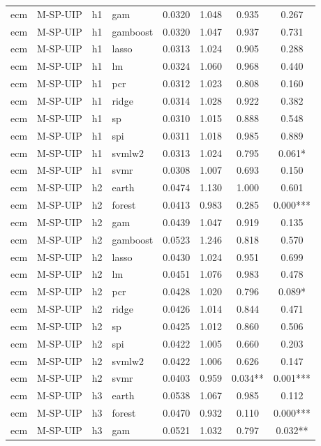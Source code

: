 \begin{ThreePartTable}
\begin{longtable}[t]{llclcccc}
ecm & M-SP-UIP & h1 & gam & 0.0320 & 1.048 & 0.935 & 0.267\\
ecm & M-SP-UIP & h1 & gamboost & 0.0320 & 1.047 & 0.937 & 0.731\\
ecm & M-SP-UIP & h1 & lasso & 0.0313 & 1.024 & 0.905 & 0.288\\
ecm & M-SP-UIP & h1 & lm & 0.0324 & 1.060 & 0.968 & 0.440\\
ecm & M-SP-UIP & h1 & pcr & 0.0312 & 1.023 & 0.808 & 0.160\\
ecm & M-SP-UIP & h1 & ridge & 0.0314 & 1.028 & 0.922 & 0.382\\
ecm & M-SP-UIP & h1 & sp & 0.0310 & 1.015 & 0.888 & 0.548\\
ecm & M-SP-UIP & h1 & spi & 0.0311 & 1.018 & 0.985 & 0.889\\
ecm & M-SP-UIP & h1 & svmlw2 & 0.0313 & 1.024 & 0.795 & 0.061*\\
ecm & M-SP-UIP & h1 & svmr & 0.0308 & 1.007 & 0.693 & 0.150\\
\addlinespace
ecm & M-SP-UIP & h2 & earth & 0.0474 & 1.130 & 1.000 & 0.601\\
ecm & M-SP-UIP & h2 & forest & 0.0413 & 0.983 & 0.285 & 0.000***\\
ecm & M-SP-UIP & h2 & gam & 0.0439 & 1.047 & 0.919 & 0.135\\
ecm & M-SP-UIP & h2 & gamboost & 0.0523 & 1.246 & 0.818 & 0.570\\
ecm & M-SP-UIP & h2 & lasso & 0.0430 & 1.024 & 0.951 & 0.699\\
ecm & M-SP-UIP & h2 & lm & 0.0451 & 1.076 & 0.983 & 0.478\\
ecm & M-SP-UIP & h2 & pcr & 0.0428 & 1.020 & 0.796 & 0.089*\\
ecm & M-SP-UIP & h2 & ridge & 0.0426 & 1.014 & 0.844 & 0.471\\
ecm & M-SP-UIP & h2 & sp & 0.0425 & 1.012 & 0.860 & 0.506\\
ecm & M-SP-UIP & h2 & spi & 0.0422 & 1.005 & 0.660 & 0.203\\
ecm & M-SP-UIP & h2 & svmlw2 & 0.0422 & 1.006 & 0.626 & 0.147\\
ecm & M-SP-UIP & h2 & svmr & 0.0403 & 0.959 & 0.034** & 0.001***\\
\addlinespace
ecm & M-SP-UIP & h3 & earth & 0.0538 & 1.067 & 0.985 & 0.112\\
ecm & M-SP-UIP & h3 & forest & 0.0470 & 0.932 & 0.110 & 0.000***\\
ecm & M-SP-UIP & h3 & gam & 0.0521 & 1.032 & 0.797 & 0.032**\\

\end{longtable}
\end{ThreePartTable}
